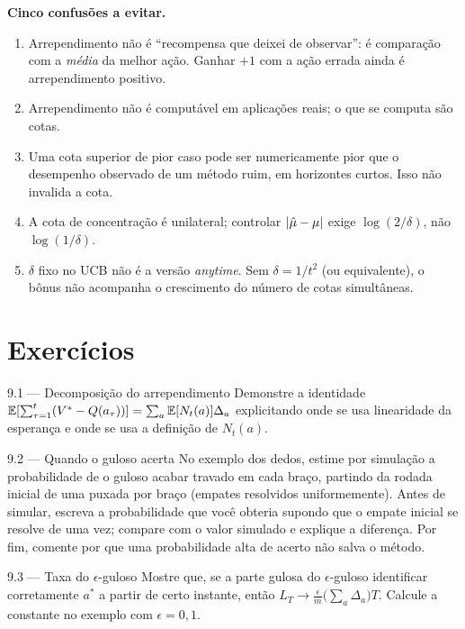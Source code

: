 \documentclass[11pt, a4paper]{article}
\newcommand{\muhat}{\hat{\mu}}
\newcommand{\Nc}{N}
\newcommand{\gap}{\Delta}
\newcommand{\Reg}{L}
\begin{document}
\begin{alertabox}
\textbf{Cinco confusões a evitar.}
\begin{enumerate}
  \item Arrependimento não é ``recompensa que deixei de observar'': é
        comparação com a \emph{média} da melhor ação. Ganhar $+1$ com a ação
        errada ainda é arrependimento positivo.
  \item Arrependimento não é computável em aplicações reais; o que se
        computa são cotas.
  \item Uma cota superior de pior caso pode ser numericamente pior que o
        desempenho observado de um método ruim, em horizontes curtos. Isso
        não invalida a cota.
  \item A cota de concentração é unilateral; controlar $\abs{\muhat-\mu}$
        exige $\log(2/\delta)$, não $\log(1/\delta)$.
  \item $\delta$ fixo no UCB não é a versão \emph{anytime}. Sem
        $\delta = 1/t^2$ (ou equivalente), o bônus não acompanha o
        crescimento do número de cotas simultâneas.
\end{enumerate}
\end{alertabox}

\section{Exercícios}

\begin{exbox}{9.1 --- Decomposição do arrependimento}
Demonstre a identidade
$\E[\sum_{\tau=1}^{t}(V^{*}-Q(a_\tau))] = \sum_a \E[\Nc_t(a)]\gap_a$
explicitando onde se usa linearidade da esperança e onde se usa a definição
de $\Nc_t(a)$.
\end{exbox}

\begin{exbox}{9.2 --- Quando o guloso acerta}
No exemplo dos dedos, estime por simulação a probabilidade de o guloso
acabar travado em cada braço, partindo da rodada inicial de uma puxada por
braço (empates resolvidos uniformemente). Antes de simular, escreva a
probabilidade que você obteria supondo que o empate inicial se resolve de
uma vez; compare com o valor simulado e explique a diferença. Por fim,
comente por que uma probabilidade alta de acerto não salva o método.
\end{exbox}

\begin{exbox}{9.3 --- Taxa do $\epsilon$-guloso}
Mostre que, se a parte gulosa do $\epsilon$-guloso identificar corretamente
$a^{*}$ a partir de certo instante, então
$\Reg_T \to \frac{\epsilon}{m}\bigl(\sum_a \gap_a\bigr)T$. Calcule a
constante no exemplo com $\epsilon = 0{,}1$.
\end{exbox}
\end{document}
